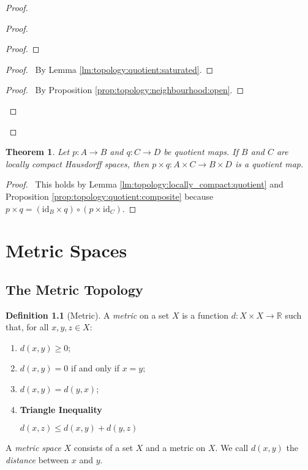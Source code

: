 \documentclass{report}
\let\qed\relax
\newtheorem{thm}[lm]{Theorem}
\theoremstyle{definition}
\newtheorem{df}[lm]{Definition}
\newcommand{\id}[1]{\ensuremath{\mathrm{id}_{#1}}}
\newcommand{\inv}[1]{\ensuremath{{#1}^{-1}}}
\begin{document}
\begin{proof}
\begin{proof}
\begin{proof}
       \step{<3>3}{$b \in \inv{p}(p(U_n))$}
     \end{proof}
     \begin{proof}
       \pf\ By Lemma \ref{lm:topology:quotient:saturated}.
     \end{proof}
     \qedstep
     \begin{proof}
       \pf\ By Proposition \ref{prop:topology:neighbourhood:open}.
     \end{proof}
   \end{proof}
   \qed
  \end{proof}

    \begin{thm}
   Let $p : A \rightarrow B$ and $q : C \rightarrow D$ be quotient maps. If $B$
and $C$ are locally compact Hausdorff spaces, then $p \times q : A \times C
\rightarrow B \times D$ is a quotient map.
  \end{thm}

  \begin{proof}
    \pf\ This holds by Lemma
\ref{lm:topology:locally_compact:quotient} and Proposition
\ref{prop:topology:quotient:composite} because $p \times q = (\id{B} \times q)
\circ (p \times
\id{C})$. \qed
  \end{proof}

  \chapter{Metric Spaces}

  \section{The Metric Topology}

  \begin{df}[Metric]
    A \emph{metric} on a set $X$ is a function $d : X \times X \rightarrow
    \mathbb{R}$ such that, for all $x, y, z \in X$:
    \begin{enumerate}
      \item $d(x, y) \geq 0$;
      \item $d(x, y) = 0$ if and only if $x = y$;
      \item $d(x, y) = d(y, x)$;
      \item \textbf{Triangle Inequality}

      $d(x, z) \leq d(x, y) + d(y, z)$
    \end{enumerate}
    A \emph{metric space} $X$ consists of a set $X$ and a metric on $X$. We
    call $d(x, y)$ the \emph{distance} between $x$ and $y$.
  \end{df}
\end{document}
